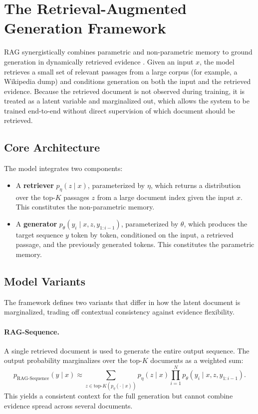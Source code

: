 \documentclass[12pt,a4paper,titlepage,oneside]{book}
\begin{document}
\section{The Retrieval-Augmented Generation Framework}
RAG synergistically combines parametric and non-parametric memory to ground generation in dynamically retrieved evidence \cite{lewis2020rag}. Given an input $x$, the model retrieves a small set of relevant passages from a large corpus (for example, a Wikipedia dump) and conditions generation on both the input and the retrieved evidence. Because the retrieved document is not observed during training, it is treated as a latent variable and marginalized out, which allows the system to be trained end-to-end without direct supervision of which document should be retrieved.

\subsection{Core Architecture}
The model integrates two components:
\begin{itemize}
    \item A \textbf{retriever} $p_{\eta}(z \mid x)$, parameterized by $\eta$, which returns a distribution over the top-$K$ passages $z$ from a large document index given the input $x$. This constitutes the non-parametric memory.
    \item A \textbf{generator} $p_{\theta}(y_i \mid x, z, y_{1:i-1})$, parameterized by $\theta$, which produces the target sequence $y$ token by token, conditioned on the input, a retrieved passage, and the previously generated tokens. This constitutes the parametric memory.
\end{itemize}

\subsection{Model Variants}
The framework defines two variants that differ in how the latent document is marginalized, trading off contextual consistency against evidence flexibility.

\paragraph{RAG-Sequence.} A single retrieved document is used to generate the entire output sequence. The output probability marginalizes over the top-$K$ documents as a weighted sum:
\begin{equation}
p_{\text{RAG-Sequence}}(y \mid x) \approx \sum_{z \in \text{top-}K(p_{\eta}(\cdot \mid x))} p_{\eta}(z \mid x) \prod_{i=1}^{N} p_{\theta}(y_i \mid x, z, y_{1:i-1}).
\end{equation}
This yields a consistent context for the full generation but cannot combine evidence spread across several documents.
\end{document}
